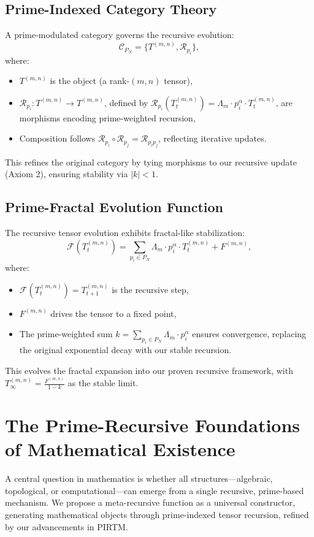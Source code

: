 \documentclass{article}
\theoremstyle{plain}
\begin{document}
\subsection{Prime-Indexed Category Theory}
A prime-modulated category governs the recursive evolution:
\begin{equation}
    \mathcal{C}_{P_N} = \{ T^{(m,n)}, \mathcal{R}_{p_i} \},
\end{equation}
where:
\begin{itemize}
    \item \( T^{(m,n)} \) is the object (a rank-$(m,n)$ tensor),
    \item \( \mathcal{R}_{p_i}: T^{(m,n)} \to T^{(m,n)} \), defined by \( \mathcal{R}_{p_i}(T_t^{(m,n)}) = \Lambda_m \cdot p_i^\alpha \cdot T_t^{(m,n)} \), are morphisms encoding prime-weighted recursion,
    \item Composition follows \( \mathcal{R}_{p_i} \circ \mathcal{R}_{p_j} = \mathcal{R}_{p_i p_j} \), reflecting iterative updates.
\end{itemize}
This refines the original category by tying morphisms to our recursive update (Axiom 2), ensuring stability via \( |k| < 1 \).

\subsection{Prime-Fractal Evolution Function}
The recursive tensor evolution exhibits fractal-like stabilization:
\begin{equation}
    \mathcal{F}(T_t^{(m,n)}) = \sum_{p_i \in P_N} \Lambda_m \cdot p_i^\alpha \cdot T_t^{(m,n)} + F^{(m,n)},
\end{equation}
where:
\begin{itemize}
    \item \( \mathcal{F}(T_t^{(m,n)}) = T_{t+1}^{(m,n)} \) is the recursive step,
    \item \( F^{(m,n)} \) drives the tensor to a fixed point,
    \item The prime-weighted sum \( k = \sum_{p_i \in P_N} \Lambda_m \cdot p_i^\alpha \) ensures convergence, replacing the original exponential decay with our stable recursion.
\end{itemize}
This evolves the fractal expansion into our proven recursive framework, with \( T_\infty^{(m,n)} = \frac{F^{(m,n)}}{1 - k} \) as the stable limit.

\section{The Prime-Recursive Foundations of Mathematical Existence}
A central question in mathematics is whether all structures—algebraic, topological, or computational—can emerge from a single recursive, prime-based mechanism. We propose a meta-recursive function as a universal constructor, generating mathematical objects through prime-indexed tensor recursion, refined by our advancements in PIRTM.
\end{document}
